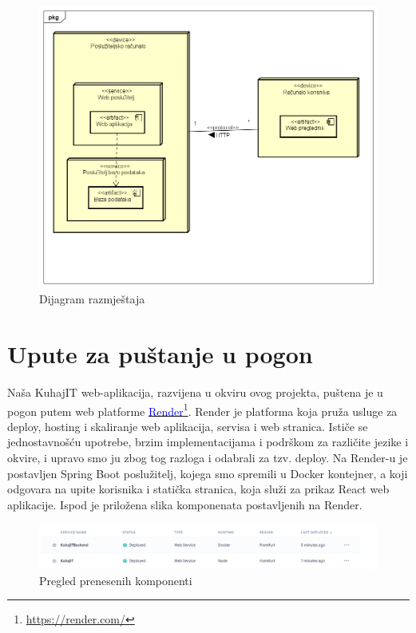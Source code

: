 					\begin{figure}[H]
			\includegraphics[scale=0.4]{dijagrami/UML_dijagram_razmjestaja.PNG} %
			\centering
			\caption{Dijagram razmještaja}
			\label{Dijagram razmještaja}
		\end{figure}
		
		

			\eject 
		
		\section{Upute za puštanje u pogon}
		Naša KuhajIT web-aplikacija, razvijena u okviru ovog projekta, puštena je u pogon putem web platforme  \textcolor{blue}{\underline{\href{https://render.com/}{\textcolor{blue}{Render}}}}\footnote{\url{https://render.com/}}. Render je platforma koja pruža usluge za deploy, hosting i skaliranje web aplikacija, servisa i web stranica. Ističe se jednostavnošću upotrebe, brzim implementacijama i podrškom za različite jezike i okvire, i upravo smo ju zbog tog razloga i odabrali za tzv. deploy. Na Render-u je postavljen Spring Boot poslužitelj, kojega smo spremili u Docker kontejner, a koji odgovara na upite korisnika i statička stranica, koja služi za prikaz React web aplikacije. Ispod je priložena slika komponenata postavljenih na Render.
		
		
			\begin{figure}[H]
			\includegraphics[scale=0.3]{slike/Render_OVERVIEW.JPG} %
			\centering
			\caption{Pregled prenesenih komponenti}
			\label{Pregled prenesenih komponenti}
		\end{figure}
		
